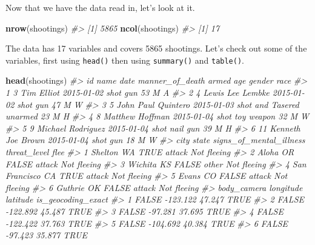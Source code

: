 \documentclass[
  12pt,
]{book}
\newenvironment{Shaded}{\begin{snugshade}}{\end{snugshade}}
\newcommand{\CommentTok}[1]{\textcolor[rgb]{0.37,0.37,0.37}{\textit{#1}}}
\newcommand{\KeywordTok}[1]{\textcolor[rgb]{0.27,0.27,0.27}{\textbf{#1}}}
\newcommand{\NormalTok}[1]{#1}
\begin{document}
Now that we have the data read in, let's look at it.

\begin{Shaded}
\begin{Highlighting}[]
\KeywordTok{nrow}\NormalTok{(shootings)}
\CommentTok{\#\textgreater{} [1] 5865}
\KeywordTok{ncol}\NormalTok{(shootings)}
\CommentTok{\#\textgreater{} [1] 17}
\end{Highlighting}
\end{Shaded}

The data has 17 variables and covers 5865 shootings. Let's check out some of the variables, first using \texttt{head()} then using \texttt{summary()} and \texttt{table()}.

\begin{Shaded}
\begin{Highlighting}[]
\KeywordTok{head}\NormalTok{(shootings)}
\CommentTok{\#\textgreater{}   id               name       date  manner\_of\_death      armed age gender race}
\CommentTok{\#\textgreater{} 1  3         Tim Elliot 2015{-}01{-}02             shot        gun  53      M    A}
\CommentTok{\#\textgreater{} 2  4   Lewis Lee Lembke 2015{-}01{-}02             shot        gun  47      M    W}
\CommentTok{\#\textgreater{} 3  5 John Paul Quintero 2015{-}01{-}03 shot and Tasered    unarmed  23      M    H}
\CommentTok{\#\textgreater{} 4  8    Matthew Hoffman 2015{-}01{-}04             shot toy weapon  32      M    W}
\CommentTok{\#\textgreater{} 5  9  Michael Rodriguez 2015{-}01{-}04             shot   nail gun  39      M    H}
\CommentTok{\#\textgreater{} 6 11  Kenneth Joe Brown 2015{-}01{-}04             shot        gun  18      M    W}
\CommentTok{\#\textgreater{}            city state signs\_of\_mental\_illness threat\_level        flee}
\CommentTok{\#\textgreater{} 1       Shelton    WA                    TRUE       attack Not fleeing}
\CommentTok{\#\textgreater{} 2         Aloha    OR                   FALSE       attack Not fleeing}
\CommentTok{\#\textgreater{} 3       Wichita    KS                   FALSE        other Not fleeing}
\CommentTok{\#\textgreater{} 4 San Francisco    CA                    TRUE       attack Not fleeing}
\CommentTok{\#\textgreater{} 5         Evans    CO                   FALSE       attack Not fleeing}
\CommentTok{\#\textgreater{} 6       Guthrie    OK                   FALSE       attack Not fleeing}
\CommentTok{\#\textgreater{}   body\_camera longitude latitude is\_geocoding\_exact}
\CommentTok{\#\textgreater{} 1       FALSE  {-}123.122   47.247               TRUE}
\CommentTok{\#\textgreater{} 2       FALSE  {-}122.892   45.487               TRUE}
\CommentTok{\#\textgreater{} 3       FALSE   {-}97.281   37.695               TRUE}
\CommentTok{\#\textgreater{} 4       FALSE  {-}122.422   37.763               TRUE}
\CommentTok{\#\textgreater{} 5       FALSE  {-}104.692   40.384               TRUE}
\CommentTok{\#\textgreater{} 6       FALSE   {-}97.423   35.877               TRUE}
\end{Highlighting}
\end{Shaded}
\end{document}
